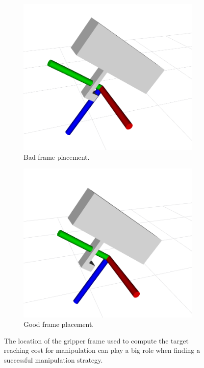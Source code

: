 \begin{figure}[t]
\centering
\begin{subfigure}{0.48\columnwidth}
    \includegraphics[width=\linewidth]{figures/panda_grasp_2.png}
    \caption{Bad frame placement.}
\end{subfigure}%
\hfill
\begin{subfigure}{0.48\columnwidth}
    \includegraphics[width=\linewidth]{figures/panda_grasp_1.png}
    \caption{Good frame placement.}
\end{subfigure}%
\hfill
\caption{The location of the gripper frame used to compute the target reaching cost for manipulation can play a big role when finding a successful manipulation strategy.}\label{fig:frame_placement}
\end{figure}

